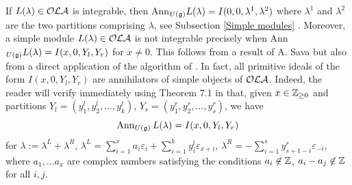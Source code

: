 \documentclass[12pt]{amsart}
\makeatletter
\def\mathbb{\Bbb}
\def\mathfrak{\frak}
\def\mathcal{\cal}
\def\@putname#1#2#3#4{\def\@@ref{#3}\let\old@bf\bf
        \def\bf##1{\old@bf\if?\noexpand##1?{#4}\else##1\fi}%
        #1{#2}%
        \let\bf\old@bf}
\def\@putname#1#2#3#4{\def\@@ref{#3}\let\old@bf\bf    %
        \let\old@reset@font\reset@font                  %
        \def\bf##1{\old@bf\if?\noexpand##1?{#4}\else##1\fi}%
        \def\reset@font##1##2{\old@reset@font##1\if?\noexpand##2?{#4}\else##2\fi}#1{#2}%
        \let\bf\old@bf\let\reset@font\old@reset@font}
\let\my@ref=\ref
\def\ref#1{\@putname\my@ref{#1}{#1}{\tiny\rm\@@ref}}
\let\my@cite=\cite
\def\cite#1{\@putname\my@cite{#1}{\@citeb}{\tiny\rm\@@ref}}
\theoremstyle{plain} %
\numberwithin{equation}{section}
\theoremstyle{definition}
\theoremstyle{remark}
\theoremstyle{plain} %
\newcommand{\fg}{\mathfrak{g}}
\makeatother
\begin{document}
 If $L(\lambda)\in \mathcal{OLA}$ is integrable, then Ann$_{U(\fg)}L(\lambda)=I(0,0,\lambda^1,\lambda^2)$ where $\lambda^1$ and $\lambda^2$ are the two partitions comprising $\lambda$, see Subsection \ref{Simple modules}. Moreover, a simple module $L(\lambda)\in\mathcal{OLA}$ is not integrable precisely when Ann$_{U(\fg)}L(\lambda)=I(x,0,Y_l,Y_r)$ for $x\neq 0$. This follows from a result of A. Sava \cite{Sava} but also from a direct application of the algorithm of \cite{PP2}. 
In fact, all primitive ideals of the form $ I(x,0,Y_l, Y_r)$ are annihilators of simple objects of $\mathcal{OLA}$.       Indeed,  the reader will verify immediately using Theorem 7.1 in \cite{PP3} that, given $x\in \mathbb Z_{\geq 0}$ and partitions $Y_l=(y^l_1, y^l_2, \dots,y^l_k)$, $Y_r=(y^r_1, y^r_2, \dots,y^r_s)$, we have
$$\operatorname{Ann}_{U(\fg)}L(\lambda) = I(x,0,Y_l, Y_r)$$
for $\lambda:= \lambda^L+\lambda^R$, $\lambda^L=\sum^x_{i=1} a_i \varepsilon_i + \sum^k_{i=1}y^l_i\varepsilon_{x+i}$, $\lambda^R= -\sum^s_{i=1}y^r_{s+1-i} \varepsilon_{-i}$, where $a_1,\dots a_x$ are complex numbers satisfying the conditions $a_i\not \in \mathbb{Z}$, $a_i-a_j\not\in \mathbb Z$ for all $i,j$.
\end{document}
